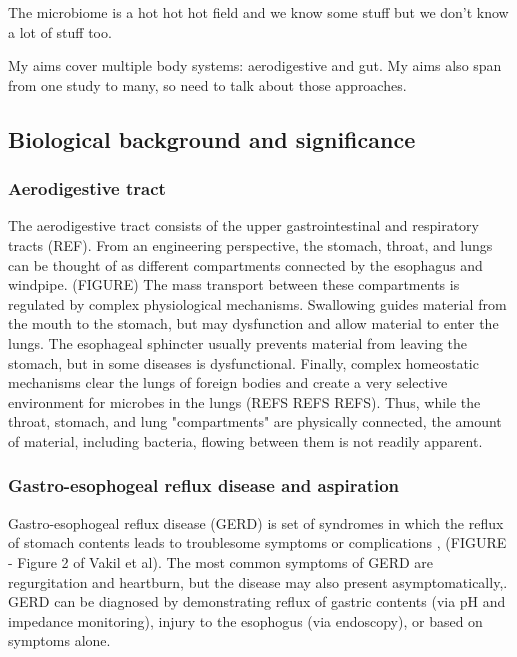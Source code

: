 \documentclass[12pt]{article}
\begin{document}
The microbiome is a hot hot hot field and we know some stuff but we 
don't know a lot of stuff too.

My aims cover multiple body systems: aerodigestive and gut. My aims 
also span from one study to many, so need to talk about those 
approaches.

\subsection{Biological background and significance}

\subsubsection{Aerodigestive tract}
The aerodigestive tract consists of the upper gastrointestinal and 
respiratory tracts (REF). From an engineering perspective, the 
stomach, throat, and lungs can be thought of as different compartments 
connected by the esophagus and windpipe. (FIGURE) The mass transport 
between these compartments is regulated by complex physiological 
mechanisms. Swallowing guides material from the mouth to the stomach, 
but may dysfunction and allow material to enter the lungs. The 
esophageal sphincter usually prevents material from leaving the 
stomach, but in some diseases is dysfunctional. Finally, complex 
homeostatic mechanisms clear the lungs of foreign bodies and create a 
very selective environment for microbes in the lungs (REFS REFS REFS). 
Thus, while the throat, stomach, and lung "compartments" are 
physically connected, the amount of material, including bacteria, 
flowing between them is not readily apparent. 

\subsubsection{Gastro-esophogeal reflux disease and aspiration}

Gastro-esophogeal reflux disease (GERD) is set of syndromes in which 
the reflux of stomach contents leads to troublesome symptoms or 
complications \cite{vakil-gerd_defn-2006},\cite{dent-gerd_epi-2005}
(FIGURE - Figure 2 of Vakil et al). The most common symptoms of GERD 
are regurgitation and heartburn, but the disease may also present 
asymptomatically\cite{vakil-gerd_defn-2006},\cite{dent-gerd_epi-2005}. 
GERD can be diagnosed by demonstrating reflux of gastric contents (via 
pH and impedance monitoring), injury to the esophogus (via endoscopy), 
or based on symptoms alone\cite{vakil-gerd_defn-2006}. 
\end{document}
